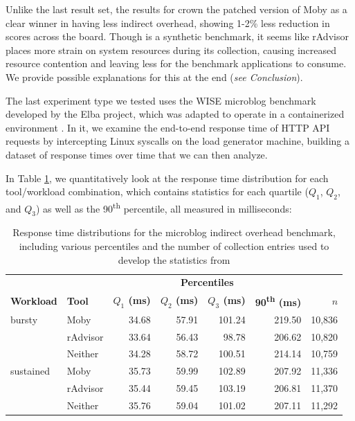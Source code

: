 \documentclass[a4paper,11pt]{article}
\begin{document}
Unlike the last result set, the results for \nbench crown the patched version of Moby
as a clear winner in having less indirect overhead,
showing 1-2\% less reduction in scores across the board.
Though \nbench is a synthetic benchmark,
it seems like rAdvisor places more strain on system resources during its collection,
causing increased resource contention and leaving less for the benchmark applications to consume.
We provide possible explanations for this at the end (\textit{see Conclusion}).

The last experiment type we tested uses the WISE microblog benchmark developed by the Elba project,
which was adapted to operate in a containerized environment \cite{Elbacontainer}.
In it, we examine the end-to-end response time of HTTP API requests
by intercepting Linux syscalls on the load generator machine,
building a dataset of response times over time that we can then analyze.

In Table \ref{tab:response_times}, we quantitatively look at the response time distribution
for each tool/workload combination,
which contains statistics for each quartile ($Q_1$, $Q_2$, and $Q_3$)
as well as the 90\textsuperscript{th} percentile, all measured in milliseconds:

\begin{table}[H]
    \vspace{1.9em}
    \caption{
        Response time distributions for the microblog indirect overhead benchmark,
        including various percentiles and the number of collection entries used to develop the statistics from
    }
    \vspace{1.4em}
    \centering
    \begin{adjustbox}{max width=\textwidth}
        \begin{tabular}{llrrrrr@{}}
            \toprule
            & & \multicolumn{4}{c}{\textbf{Percentiles}} \\ \cmidrule(r){3-6}
            \textbf{Workload} & \textbf{Tool} &
            \textbf{$Q_1$ (ms)} & \textbf{$Q_2$ (ms)} &
            \textbf{$Q_3$ (ms)} & \textbf{90\textsuperscript{th} (ms)} & \textbf{$n$} \\
            \midrule
            bursty & Moby    & 34.68 & 57.91 & 101.24 & 219.50 & 10,836 \\
            & rAdvisor       & 33.64 & 56.43 &  98.78 & 206.62 & 10,820 \\
            & Neither        & 34.28 & 58.72 & 100.51 & 214.14 & 10,759 \\
            \midrule    
            sustained & Moby & 35.73 & 59.99 & 102.89 & 207.92 & 11,336 \\
            & rAdvisor       & 35.44 & 59.45 & 103.19 & 206.81 & 11,370 \\
            & Neither        & 35.76 & 59.04 & 101.02 & 207.11 & 11,292 \\
            \bottomrule
        \end{tabular}
    \end{adjustbox}
    \label{tab:response_times}
    \vspace{-1em}
\end{table}
\end{document}
